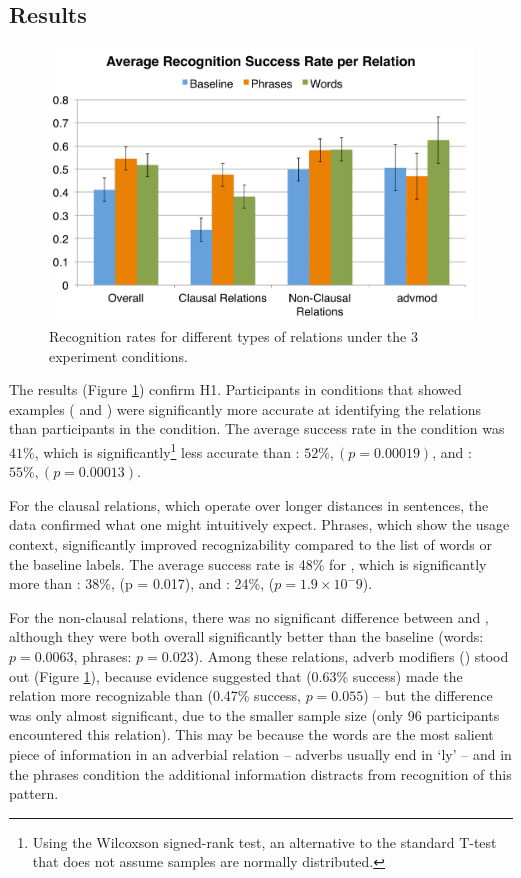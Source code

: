 \subsection{Results}
\begin{figure}
\centering
\includegraphics[width=\columnwidth]{fig/results}
\caption{\label{fig:results}Recognition rates for different types of relations under the 3 experiment conditions.}
\end{figure}
The results (Figure \ref{fig:results}) confirm H1. Participants in conditions that showed examples ( and ) were significantly more accurate at identifying the relations than participants in the  condition.  The average success rate in the  condition was $41\%$, which is significantly\footnote{Using the Wilcoxson signed-rank test, an alternative to the standard T-test that does not assume samples are normally distributed.} less accurate than : $52\%, (p = 0.00019)$, and : $55\%, (p = 0.00013)$.

For the clausal relations, which operate over longer distances in sentences, the data confirmed what one might intuitively expect. Phrases, which show the usage context, significantly improved recognizability compared to the list of words or the baseline labels. The average success rate is 48\% for , which is significantly more than : 38\%, (p = 0.017), and : 24\%, ($p= 1.9 \times 10^-9$).

For the non-clausal relations, there was no significant difference between  and , although they were both overall significantly better than the baseline (words: $p=0.0063$, phrases: $p=0.023$). Among these relations, adverb modifiers () stood out (Figure \ref{fig:results}), because evidence suggested that  (0.63\% success) made the relation more recognizable than  (0.47\% success, $p = 0.055$) -- but the difference was only almost significant, due to the smaller sample size (only 96 participants encountered this relation). This may be because the words are the most salient piece of information in an adverbial relation -- adverbs usually end in `ly' -- and in the phrases condition the additional information distracts from recognition of this pattern.

